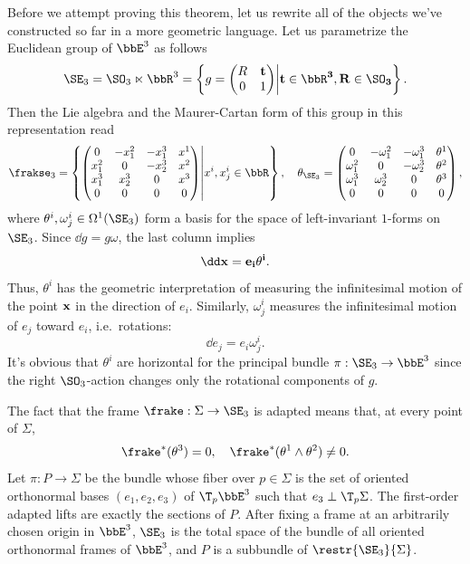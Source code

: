 Before we attempt proving this theorem, let us rewrite all of the objects we've constructed so far in a more geometric language.
Let us parametrize the Euclidean group of $\bbE^3$ as follows 
\[\SE_3=\SO_3\ltimes\bbR^3=\left\{g=\begin{pmatrix}
    R & \bf{t}\\
    0 & 1
\end{pmatrix}\middle| \bf{t}\in\bbR^3,R\in\SO_3
\right\}.\]
Then the Lie algebra and the Maurer-Cartan form of this group in this representation read
\[ \frakse_3=\left\{\begin{pmatrix}
    0 & -x_1^2 & -x_1^3& x^1\\
    x_1^2 & 0 & -x_2^3 & x^2\\
    x_1^3 & x_2^3 & 0 & x^3\\
    0 & 0& 0& 0
\end{pmatrix}\middle| x^i,x^i_j\in\bbR\right\},
\quad
\theta_{\SE_3}=
    \begin{pmatrix}
        0 & -\omega_1^2 & -\omega_1^3& \theta^1\\
        \omega_1^2 & 0 & -\omega_2^3 & \theta^2\\
        \omega_1^3 & \omega_2^3 & 0 & \theta^3\\
        0 & 0& 0& 0
    \end{pmatrix},
\]
where $\theta^i,\omega^i_j\in\Omega^1(\SE_3)$ form a basis for the space of left-invariant $1$-forms on $\SE_3$. Since $\dd g=g\omega$, the last column implies 
\[\dd \bf{x}=e_i\theta^i.\]
Thus, $\theta^i$ has the geometric interpretation of measuring the infinitesimal motion of the point $\bf{x}$ in the direction of $e_i$. Similarly, $\omega^i_j$ measures the infinitesimal motion of $e_j$ toward $e_i$, i.e.\ rotations:
\[\dd e_j=e_i\omega^i_j.\label{eq def of omegas}\]
It's obvious that $\theta^i$ are horizontal for the principal bundle $\pi:\SE_3\to\bbE^3$ since the right $\SO_3$-action changes only the rotational components of $g$.

The fact that the frame $\frake:\Sigma\to \SE_3$ is adapted means that, at every point of $\Sigma$,
\[\frake^\ast(\theta^3)=0,\quad \frake^\ast(\theta^1\wedge\theta^2)\neq 0.\label{eq 2.2 Ivey}\]
Let $\pi:P\to \Sigma$ be the bundle whose fiber over $p\in\Sigma$ is the set of oriented orthonormal bases $(e_1,e_2,e_3)$ of $\T_p \bbE^3$ such that $e_3\perp \T_p\Sigma$. The first-order adapted lifts are exactly the sections of $P$. After fixing a frame at an arbitrarily chosen origin in $\bbE^3$, $\SE_3$ is the total space of the bundle of all oriented orthonormal frames of $\bbE^3$, and $P$ is a subbundle of $\restr{\SE_3}{\Sigma}$.

